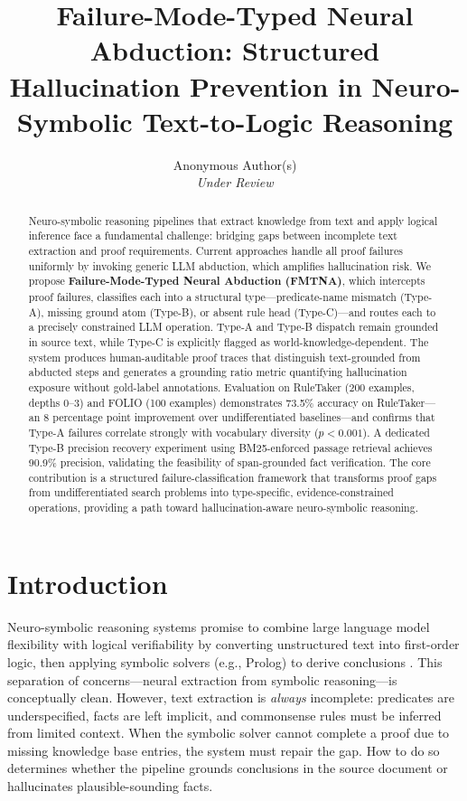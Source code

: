 \documentclass[11pt,letterpaper]{article}
\title{\textbf{Failure-Mode-Typed Neural Abduction: Structured Hallucination Prevention in Neuro-Symbolic Text-to-Logic Reasoning}}
\author{%
  Anonymous Author(s)\\
  \textit{Under Review}
}
\date{}
\begin{document}
\maketitle

\begin{abstract}
Neuro-symbolic reasoning pipelines that extract knowledge from text and apply logical inference face a fundamental challenge: bridging gaps between incomplete text extraction and proof requirements. Current approaches handle all proof failures uniformly by invoking generic LLM abduction, which amplifies hallucination risk. We propose \textbf{Failure-Mode-Typed Neural Abduction (FMTNA)}, which intercepts proof failures, classifies each into a structural type---predicate-name mismatch (Type-A), missing ground atom (Type-B), or absent rule head (Type-C)---and routes each to a precisely constrained LLM operation. Type-A and Type-B dispatch remain grounded in source text, while Type-C is explicitly flagged as world-knowledge-dependent. The system produces human-auditable proof traces that distinguish text-grounded from abducted steps and generates a grounding ratio metric quantifying hallucination exposure without gold-label annotations. Evaluation on RuleTaker (200 examples, depths 0--3) and FOLIO (100 examples) demonstrates 73.5\% accuracy on RuleTaker---an 8 percentage point improvement over undifferentiated baselines---and confirms that Type-A failures correlate strongly with vocabulary diversity ($p{<}0.001$). A dedicated Type-B precision recovery experiment using BM25-enforced passage retrieval achieves 90.9\% precision, validating the feasibility of span-grounded fact verification. The core contribution is a structured failure-classification framework that transforms proof gaps from undifferentiated search problems into type-specific, evidence-constrained operations, providing a path toward hallucination-aware neuro-symbolic reasoning.
\end{abstract}

\section{Introduction}

Neuro-symbolic reasoning systems promise to combine large language model flexibility with logical verifiability by converting unstructured text into first-order logic, then applying symbolic solvers (e.g., Prolog) to derive conclusions \citep{Cotnareanu2026,Lee2024,Li2025}. This separation of concerns---neural extraction from symbolic reasoning---is conceptually clean. However, text extraction is \emph{always} incomplete: predicates are underspecified, facts are left implicit, and commonsense rules must be inferred from limited context. When the symbolic solver cannot complete a proof due to missing knowledge base entries, the system must repair the gap. How to do so determines whether the pipeline grounds conclusions in the source document or hallucinates plausible-sounding facts.
\end{document}
